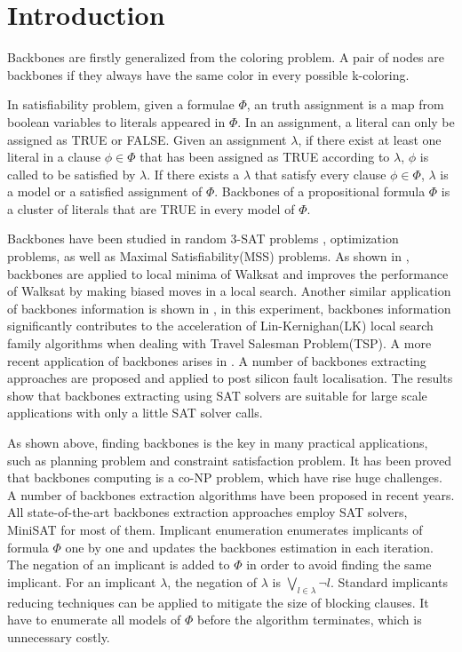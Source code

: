 
\section{Introduction}

Backbones are firstly generalized from the coloring problem. A pair of nodes are backbones if they always have the same color in every possible k-coloring\cite{WTS2001}.

In satisfiability problem, given a formulae $\Phi$, an truth assignment is a map from boolean variables to literals appeared in $\Phi$. In an assignment, a literal can only be assigned as TRUE or FALSE. Given an assignment $\lambda$, if there exist at least one literal in a clause $\phi\in\Phi$ that has been assigned as TRUE according to $\lambda$, $\phi$ is called to be satisfied by $\lambda$. If there exists a $\lambda$ that satisfy every clause $\phi\in\Phi$, $\lambda$ is a model or a satisfied assignment of $\Phi$.
Backbones of a propositional formula $\Phi$ is a cluster of literals that are TRUE in every model of $\Phi$\cite{BCJ2001,KPJ2005}.

Backbones have been studied in random 3-SAT problems \cite{DOG2001}, optimization problems\cite{CJG2001,KPS2005,WTS2001}, as well as Maximal Satisfiability(MSS) problems\cite{MM2005}.
As shown in \cite{ZWR2003}, backbones are applied to local minima of Walksat and improves the performance of Walksat by making biased moves in a local search. Another similar application of backbones information is shown in \cite{ZWL2005}, in this experiment, backbones information significantly contributes to the acceleration of Lin-Kernighan(LK) local search family algorithms when dealing with Travel Salesman Problem(TSP).
A more recent application of backbones arises in \cite{Z11}. A number of backbones extracting approaches are proposed and applied to post silicon fault localisation. The results show that backbones extracting using SAT solvers are suitable for large scale applications with only a little SAT solver calls.

As shown above, finding backbones is the key in many practical applications, such as planning problem and constraint satisfaction problem. It has been proved that backbones computing is a co-NP problem\cite{Jan10}, which have rise huge challenges.
A number of backbones extraction algorithms have been proposed in recent years. All state-of-the-art backbones extraction approaches employ SAT solvers, MiniSAT\cite{MINISAT} for most of them.
Implicant enumeration\cite{MK2002,RSF2004} enumerates implicants of formula $\Phi$ one by one and updates the backbones estimation in each iteration. The negation of an implicant is added to $\Phi$ in order to avoid finding the same implicant. For an implicant $\lambda$, the negation of $\lambda$ is $\bigvee_{l\in\lambda}\neg l$. Standard implicants reducing techniques can be applied to mitigate the size of blocking clauses. It have to enumerate all models of $\Phi$ before the algorithm terminates, which is unnecessary costly.

